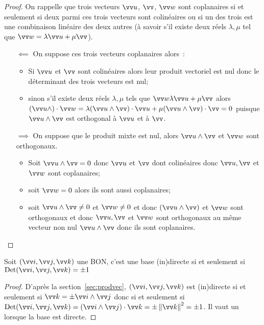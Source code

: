 \begin{proof}
  On rappelle que trois vecteurs $\vu$, $\vv$, $\vw$ sont coplanaires si et seulement si deux parmi ces trois vecteurs sont colinéaires ou si un des trois est une combinaison linéaire des deux autres (à savoir s'il existe deux réels $\lambda,\mu$ tel que $\vw=\lambda\vu+\mu\vv$).
  \begin{itemize}
  \item[$\impliedby$] On suppose ces trois vecteurs coplanaires alors~:
    \begin{itemize}
    \item Si $\vu$ et $\vv$ sont colinéaires alors leur produit vectoriel est nul donc le déterminant des trois vecteurs est nul;
    \item sinon s'il existe deux réels $\lambda,\mu$ tels que $\vw\lambda\vu+\mu\vv$ alors $(\vu\wedge)\cdot\vw=\lambda(\vu\wedge\vv)\cdot\vu+\mu(\vu\wedge\vv)\cdot\vv=0$ puisque $\vu\wedge\vv$ est orthogonal à $\vu$ et à $\vv$.
    \end{itemize}
  \item[$\implies$] On suppose que le produit mixte est nul, alors $\vu\wedge\vv$ et $\vw$ sont orthogonaux. 
    \begin{itemize}
    \item Soit $\vu\wedge\vv=0$ donc $\vu$ et $\vv$ dont colinéaires donc $\vu,\vv$ et $\vw$ sont coplanaires;
    \item soit $\vw=0$ alors ils sont aussi coplanaires;
    \item soit $\vu\wedge\vv \neq 0$ et $\vw\neq 0$ et donc $(\vu\wedge\vv)$ et $\vw$ sont \og orthogonaux \fg{} et donc $\vu,\vv$ et $\vw$ sont orthogonaux au même vecteur non nul $\vu\wedge\vv$ donc ils sont coplanaires.
    \end{itemize}
  \end{itemize}
\end{proof}
\begin{prop}
  Soit $\bondtrois$ une BON, c'est une base (in)directe si et seulement si $\Det\bondtrois=\pm 1$
\end{prop}
\begin{proof}
  D'après la section~\ref{sec:prodvec}, $\bondtrois$ est (in)directe si et seulement si $\vk=\pm\vi\wedge\vj$ donc si et seulement si $\Det\bondtrois=(\vi\wedge\vj)\cdot\vk=\pm\norme{\vk}^2=\pm 1$. Il vaut un lorsque la base est directe.
\end{proof}

